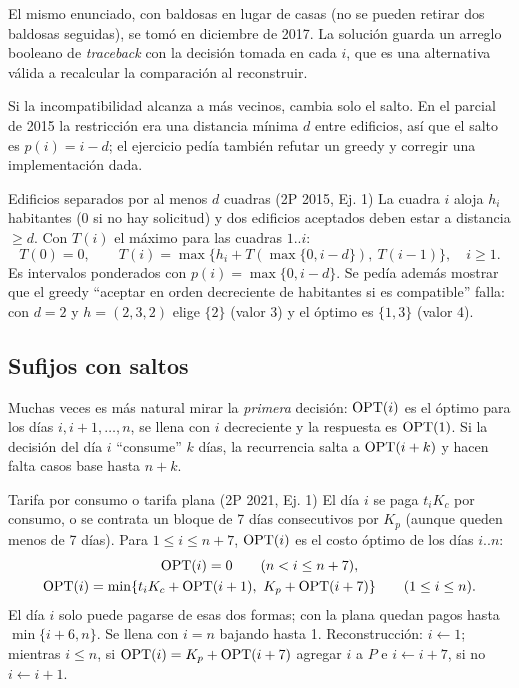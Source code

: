El mismo enunciado, con baldosas en lugar de casas (no se pueden retirar dos
baldosas seguidas), se tomó en diciembre de 2017. La solución guarda un
arreglo booleano de \emph{traceback} con la decisión tomada en cada $i$, que
es una alternativa válida a recalcular la comparación al
reconstruir.

Si la incompatibilidad alcanza a más vecinos, cambia solo el salto. En el
parcial de 2015 la restricción era una distancia mínima $d$ entre edificios,
así que el salto es $p(i)=i-d$; el ejercicio pedía también refutar un greedy
y corregir una implementación dada.

\begin{problema}{Edificios separados por al menos $d$ cuadras (2P 2015, Ej. 1)}
La cuadra $i$ aloja $h_i$ habitantes (0 si no hay solicitud) y dos edificios
aceptados deben estar a distancia $\ge d$. Con $T(i)$ el máximo para las
cuadras $1..i$:
\[
T(0)=0,\qquad T(i)=\max\bigl\{h_i+T(\max\{0,i-d\}),\ T(i-1)\bigr\},\quad i\ge1.
\]
Es intervalos ponderados con $p(i)=\max\{0,i-d\}$. Se pedía además mostrar
que el greedy ``aceptar en orden decreciente de habitantes si es compatible''
falla: con $d=2$ y $h=(2,3,2)$ elige $\{2\}$ (valor 3) y el óptimo es
$\{1,3\}$ (valor 4).
\end{problema}

\subsection{Sufijos con saltos}

Muchas veces es más natural mirar la \emph{primera} decisión: $\mathrm{OPT}(i)$ es el
óptimo para los días $i,i+1,\dots,n$, se llena con $i$ decreciente y la
respuesta es $\mathrm{OPT}(1)$. Si la decisión del día $i$ ``consume'' $k$ días, la
recurrencia salta a $\mathrm{OPT}(i+k)$ y hacen falta casos base hasta
$n+k$.

\begin{problema}{Tarifa por consumo o tarifa plana (2P 2021, Ej. 1)}
El día $i$ se paga $t_iK_c$ por consumo, o se contrata un bloque de 7 días
consecutivos por $K_p$ (aunque queden menos de 7 días). Para
$1\le i\le n+7$, $\mathrm{OPT}(i)$ es el costo óptimo de los días $i..n$:
\begin{gather*}
\mathrm{OPT}(i)=0\qquad (n<i\le n+7),\\
\mathrm{OPT}(i)=\min\{t_iK_c+\mathrm{OPT}(i+1),\ K_p+\mathrm{OPT}(i+7)\}\qquad (1\le i\le n).
\end{gather*}
El día $i$ solo puede pagarse de esas dos formas; con la plana quedan pagos
hasta $\min\{i+6,n\}$. Se llena con $i=n$ bajando hasta 1. Reconstrucción:
$i\gets1$; mientras $i\le n$, si $\mathrm{OPT}(i)=K_p+\mathrm{OPT}(i+7)$ agregar $i$ a $P$ e
$i\gets i+7$, si no $i\gets i+1$.
\end{problema}

